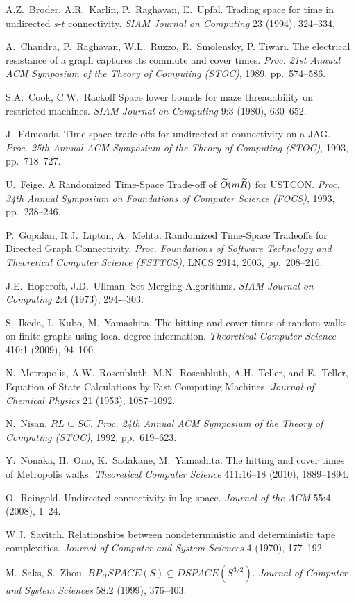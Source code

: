 \documentclass[11pt,a4paper]{article}
\renewcommand{\O}{\ensuremath \widetilde O}
\renewcommand{\*}{\hspace*{5mm}}
\begin{document}
\begin{thebibliography}{19}
A.Z.~Broder, A.R.~Karlin, P.~Raghavan, E.~Upfal.
Trading space for time in undirected $s$-$t$ connectivity.
\emph{SIAM Journal on Computing }23 (1994), 324--334.

A.~Chandra, P.~Raghavan, W.L.~Ruzzo, R.~Smolensky, P. Tiwari.
The electrical resistance of a graph captures its commute and cover times.
\emph{Proc. 21st Annual ACM Symposium of the Theory of Computing (STOC)}, 1989, pp.~574--586.

S.A.~Cook, C.W.~Rackoff
Space lower bounds for maze threadability on restricted machines.
\emph{SIAM Journal on Computing }9:3 (1980), 630--652.

J.~Edmonds.
Time-space trade-offs for undirected st-connectivity on a JAG.
\emph{Proc. 25th Annual ACM Symposium of the Theory of Computing (STOC)}, 1993, pp.~718--727.

U.~Feige.
A Randomized Time-Space Trade-off of $\O(m\widetilde R)$ for USTCON.
\emph{Proc. 34th Annual Symposium on Foundations of Computer Science (FOCS)}, 1993, pp.~238--246.

P.~Gopalan, R.J.~Lipton, A.~Mehta.
Randomized Time-Space Tradeoffs for Directed Graph Connectivity.
\emph{Proc. Foundations of Software Technology and Theoretical Computer Science (FSTTCS)}, LNCS 2914, 2003, pp.~208--216.

J.E.~Hopcroft, J.D.~Ullman.
Set Merging Algorithms.
\emph{SIAM Journal on Computing }2:4 (1973), 294-–303.

S.~Ikeda, I.~Kubo, M.~Yamashita.
The hitting and cover times of random walks on finite graphs using local degree information.
\emph{Theoretical Computer Science }410:1 (2009), 94--100.

N.~Metropolis, A.W.~Rosenbluth, M.N.~Rosenbluth, A.H.~Teller, and E.~Teller,
Equation of State Calculations by Fast Computing Machines,
\emph{Journal of Chemical Physics} 21 (1953), 1087--1092.

N.~Nisan.
$RL \subseteq SC$.
\emph{Proc. 24th Annual ACM Symposium of the Theory of Computing (STOC)}, 1992, pp.~619--623.

Y.~Nonaka, H.~Ono, K.~Sadakane, M.~Yamashita.
The hitting and cover times of Metropolis walks.
\emph{Theoretical Computer Science} 411:16--18 (2010), 1889--1894.

O.~Reingold.
Undirected connectivity in log-space.
\emph{Journal of the ACM} 55:4 (2008), 1--24.

W.J.~Savitch.
Relationships between nondeterministic and deterministic tape complexities.
\emph{Journal of Computer and System Sciences} 4 (1970), 177--192.

M.~Saks, S.~Zhou.
$BP_H SPACE(S) \subseteq DSPACE(S^{3/2})$.
\emph{Journal of Computer and System Sciences} 58:2 (1999), 376--403.

\end{thebibliography}
\end{document}
